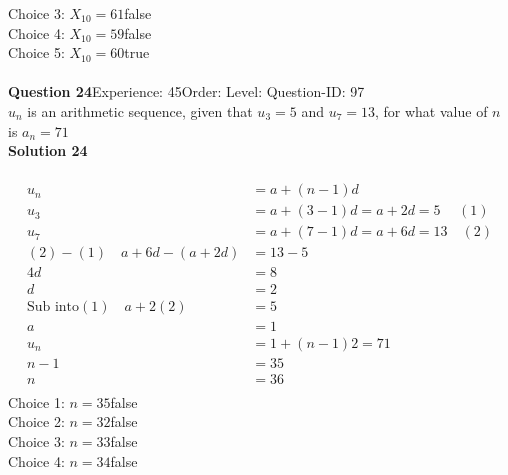 \documentclass{article}
\begin{document}
Choice 3: \hspace{20pt}$X_{10}=61$\hspace{20pt}false\\
Choice 4: \hspace{20pt}$X_{10}=59$\hspace{20pt}false\\
Choice 5: \hspace{20pt}$X_{10}=60$\hspace{20pt}true\\
\\[4pt]
\noindent\textbf{Question 24}\hspace{20pt}Experience: 45\hspace{20pt}Order: \hspace{20pt}Level: \hspace{20pt}Question-ID: 97\\[2pt]
$u_n$ is an arithmetic sequence, given that $u_{3}=5$ and $u_{7}=13$, for what value of $n$ is $a_n=71$\\[4pt]
\noindent\textbf{Solution 24}\\[2pt]
\\[-35pt]\begin{align*}
u_n&=a+(n-1)d\\[2pt]
u_3&=a+(3-1)d=a+2d=5 \hspace{15pt} (1)\\[2pt]
u_7&=a+(7-1)d=a+6d=13\quad (2) \\[2pt]
(2)-(1)\quad a+6d-(a+2d)&=13-5\\[2pt]
4d&=8\\[2pt]
d&=2\\[12pt]
\text{Sub into} (1) \quad a+2(2)&=5\\[2pt]
a&=1\\[12pt]
u_n&=1+(n-1)2=71\\[2pt]
n-1&=35\\[2pt]
n&=36\\[-60pt]
\end{align*}
Choice 1: \hspace{20pt}$n=35$\hspace{20pt}false\\
Choice 2: \hspace{20pt}$n=32$\hspace{20pt}false\\
Choice 3: \hspace{20pt}$n=33$\hspace{20pt}false\\
Choice 4: \hspace{20pt}$n=34$\hspace{20pt}false\\
\end{document}
